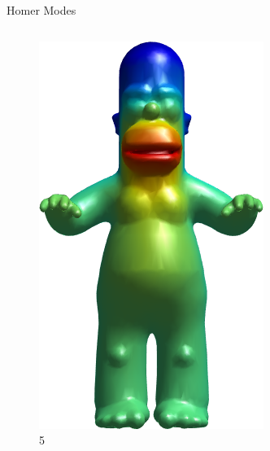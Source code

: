 \documentclass{beamer}
\begin{document}
\begin{frame}{Homer Modes}
\begin{columns}
\begin{column}[T]{3cm}
\begin{figure}[t]
    \includegraphics[width=\textwidth]{Harmonics/HomerModes/5.png}
    \caption*{\huge 5}
\end{figure}
\end{column}
\end{columns}

\end{frame}
\end{document}
